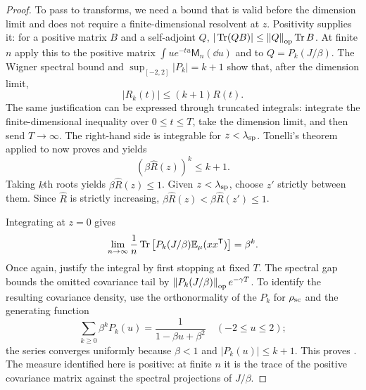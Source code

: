 \begin{proof}
To pass to transforms, we need a bound that is valid before the
dimension limit and does not require a finite-dimensional resolvent at
$z$.  Positivity supplies it: for a positive matrix $B$ and a
self-adjoint $Q$, $|\operatorname{Tr}(QB)|\le\left\lVert Q\right\rVert_{\mathrm{op}}\operatorname{Tr} B$.
At finite $n$ apply this to the positive matrix
$\int u e^{-tu}\mathsf M_n(\dd u)$ and to
$Q=P_k(J/\beta)$.  The Wigner spectral bound and
$\sup_{[-2,2]}|P_k|=k+1$ show that, after the dimension limit,
\begin{equation}
 |R_k(t)|\le(k+1)R(t).
 \label{eq:spin-polynomial-domination}
\end{equation}
The same justification can be expressed through truncated integrals:
integrate the finite-dimensional inequality over $0\le t\le T$, take
the dimension limit, and then send $T\to\infty$.  The right-hand side
is integrable for $z<\lambda_{\rm sp}$.  Tonelli's theorem applied to
 now proves
 and yields
\[
 (\beta\widehat R(z))^k\le k+1.
\]
Taking $k$th roots yields $\beta\widehat R(z)\le1$.  Given
$z<\lambda_{\rm sp}$, choose $z'$ strictly between them.  Since
$\widehat R$ is strictly increasing,
$\beta\widehat R(z)<\beta\widehat R(z')\le1$.

Integrating  at $z=0$ gives
\[
 \lim_{n\to\infty}\frac1n\operatorname{Tr}\left[
   P_k(J/\beta)\mathbb E_\mu(xx^{\mathsf T})\right]=\beta^k.
\]
Once again, justify the integral by first stopping at fixed $T$.
The spectral gap bounds the omitted covariance tail by
$\left\lVert P_k(J/\beta)\right\rVert_{\mathrm{op}}e^{-\gamma T}$.  To identify the resulting
covariance density, use the orthonormality of the $P_k$ for
$\rho_{\rm sc}$ and the generating function
\[
 \sum_{k\ge0}\beta^kP_k(u)=\frac1{1-\beta u+\beta^2}
 \quad(-2\le u\le2);
\]
the series converges uniformly because $\beta<1$ and
$|P_k(u)|\le k+1$.  This proves
.  The measure identified here is
positive: at finite $n$ it is the trace of the positive covariance
matrix against the spectral projections of $J/\beta$.


\end{proof}
